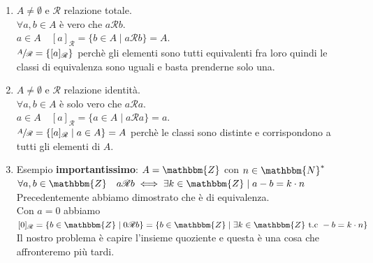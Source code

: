 \documentclass[12pt, letterpaper]{report}
\begin{document}
		\begin{enumerate}
			\item $A \neq \emptyset$ e $\mathscr{R}$ relazione totale. \\
			$\forall a,b \in A$ è vero che $a\mathscr{R}b$. \\
			$a \in A \quad [a]_\mathscr{R} = \{b \in A \mid a \mathscr{R} b\} = A$. \\
			$\sfrac{A}{\mathscr{R}} = \{[a]_\mathscr{R}\}$ perchè gli elementi sono tutti equivalenti fra loro quindi le classi di equivalenza sono uguali e basta prenderne solo una.
			\item $A \neq \emptyset$ e $\mathscr{R}$ relazione identità. \\
			$\forall a,b \in A$ è solo vero che $a\mathscr{R}a$. \\
			$a \in A \quad [a]_\mathscr{R} = \{a \in A \mid a\mathscr{R}a\} = a$. \\
			$\sfrac{A}{\mathscr{R}} = \{[a]_\mathscr{R} \mid a \in A\} = A$ perchè le classi sono distinte e corrispondono a tutti gli elementi di $A$.
			\item Esempio \textbf{importantissimo}: $A = \mathbbm{Z}$ con $n \in \mathbbm{N}^*$ \\
			$\forall a,b \in \mathbbm{Z} \quad a \mathscr{R} b \iff \exists k \in \mathbbm{Z} \mid a - b = k \cdot n$ \\
			Precedentemente abbiamo dimostrato che è di equivalenza. \\
			Con $a = 0$ abbiamo $[0]_\mathscr{R} = \{b \in \mathbbm{Z} \mid 0 \mathscr{R} b\} = \{b \in \mathbbm{Z} \mid \exists k \in \mathbbm{Z}\ \text{t.c}\ -b = k \cdot n\}$ \\
			Il nostro problema è capire l'insieme quoziente e questa è una cosa che affronteremo più tardi. \\
		\end{enumerate}
\end{document}
